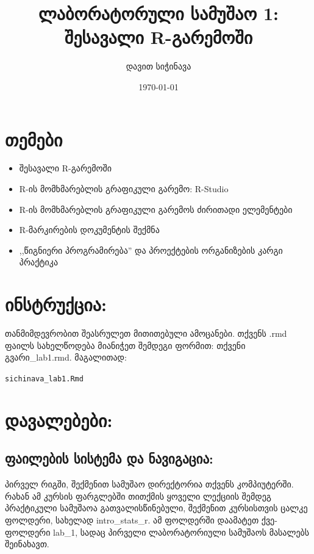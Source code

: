 \documentclass{article}\usepackage[]{graphicx}\usepackage[]{color}
\title{ლაბორატორული სამუშაო 1: შესავალი R-გარემოში}
\author{დავით სიჭინავა}
\date{\today}
\makeatletter
\newcommand{\hlstd}[1]{\textcolor[rgb]{0.345,0.345,0.345}{#1}}%
\newenvironment{kframe}{%
 \def\at@end@of@kframe{}%
 \ifinner\ifhmode%
  \def\at@end@of@kframe{\end{minipage}}%
  \begin{minipage}{\columnwidth}%
 \fi\fi%
 \def\FrameCommand##1{\hskip\@totalleftmargin \hskip-\fboxsep
 \colorbox{shadecolor}{##1}\hskip-\fboxsep
     \hskip-\linewidth \hskip-\@totalleftmargin \hskip\columnwidth}%
 \MakeFramed {\advance\hsize-\width
   \@totalleftmargin\z@ \linewidth\hsize
   \@setminipage}}%
 {\par\unskip\endMakeFramed%
 \at@end@of@kframe}
\newenvironment{knitrout}{}{} %
\makeatother
\begin{document}
\maketitle
\section*{თემები}
\begin{itemize}
\item შესავალი R-გარემოში
\item R-ის მომხმარებლის გრაფიკული გარემო: R-Studio
\item R-ის მომხმარებლის გრაფიკული გარემოს ძირითადი ელემენტები
\item R-მარკირების დოკუმენტის შექმნა
\item ,,წიგნიერი პროგრამირება'' და პროექტების ორგანიზების კარგი პრაქტიკა 
\end{itemize}

\section*{ინსტრუქცია:}

თანმიმდევრობით შეასრულეთ მითითებული ამოცანები. თქვენს .rmd ფაილს სახელწოდება მიანიჭეთ შემდეგი ფორმით: თქვენი გვარი\_lab1.rmd. მაგალითად:

\begin{knitrout}
\color{fgcolor}\begin{kframe}
\begin{alltt}
\hlstd{sichinava_lab1.Rmd}
\end{alltt}
\end{kframe}
\end{knitrout}

\section*{დავალებები:}

\subsection*{ფაილების სისტემა და ნავიგაცია:}

პირველ რიგში, შექმენით სამუშაო დირექტორია თქვენს კომპიუტერში. რახან ამ კურსის ფარგლებში თითქმის ყოველი ლექციის შემდეგ პრაქტიკული სამუშაოა გათვალისწინებული, შექმენით კურსისთვის ცალკე ფოლდერი, სახელად intro\_stats\_r. ამ ფოლდერში დაამატეთ ქვე-ფოლდერი lab\_1, სადაც პირველი ლაბორატორიული სამუშაოს მასალებს შეინახავთ.
\end{document}
